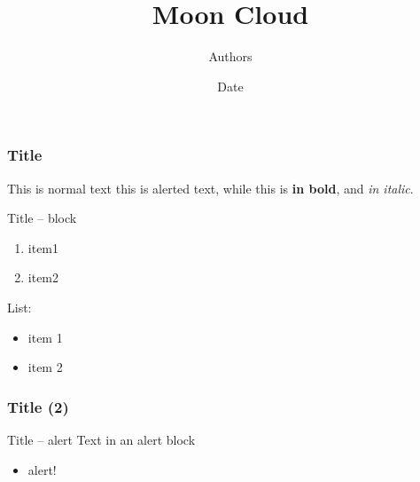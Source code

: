 \documentclass{beamer}
\title{Moon Cloud}
\date{Date}
\author{Authors}
\begin{document}
\begin{frame}
    \titlepage
\end{frame}

\begin{frame}
    \frametitle{Title}
    This is normal text \alert{this is alerted text}, while this is \textbf{in bold},
    and \textit{in italic}.

    \begin{block}{Title -- block}
        \begin{enumerate}
            \item item1
            \item item2
        \end{enumerate}
    \end{block}

    List:
    \begin{itemize}
        \item item 1
        \item item 2
    \end{itemize}
\end{frame}

\begin{frame}
    \frametitle{Title (2)}

    \begin{alertblock}{Title -- alert}
        Text in an alert block
        \begin{itemize}
            \item alert!
        \end{itemize}
        
    \end{alertblock}
\end{frame}

    
\end{document}
